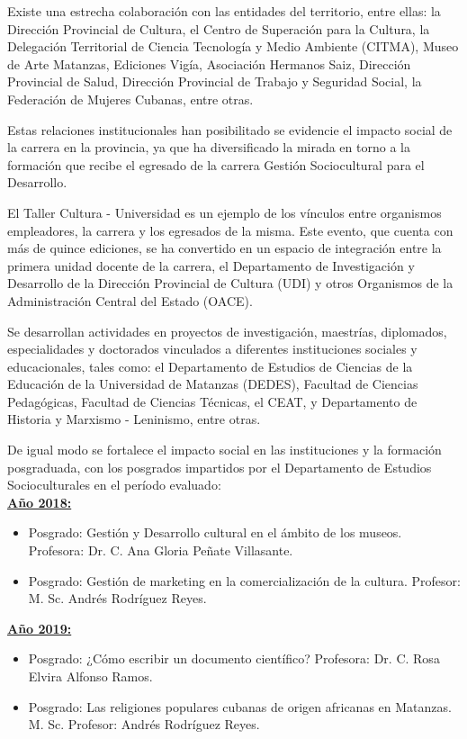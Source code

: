 Existe una estrecha colaboración con las entidades del territorio, entre ellas: la Dirección Provincial de Cultura, el Centro de Superación para la Cultura, la Delegación Territorial de Ciencia Tecnología y Medio Ambiente (CITMA), Museo de Arte Matanzas, Ediciones Vigía, Asociación Hermanos Saiz, Dirección Provincial de Salud, Dirección Provincial de Trabajo y Seguridad Social, la Federación de Mujeres Cubanas, entre otras.

Estas relaciones institucionales han posibilitado se evidencie el impacto social de la carrera en la provincia, ya que ha diversificado la mirada en torno a la formación que recibe el egresado de la carrera Gestión Sociocultural para el Desarrollo.

El Taller Cultura - Universidad es un ejemplo de los vínculos entre organismos empleadores, la carrera y los egresados de la misma. Este evento, que cuenta con más de quince ediciones, se ha convertido en un espacio de integración entre la primera unidad docente de la carrera, el Departamento de Investigación y Desarrollo de la Dirección Provincial de Cultura (UDI) y otros Organismos de la Administración Central del Estado (OACE).

Se desarrollan actividades en proyectos de investigación, maestrías, diplomados, especialidades y doctorados vinculados a diferentes instituciones sociales y educacionales, tales como: el Departamento de Estudios de Ciencias de la Educación de la Universidad de Matanzas (DEDES), Facultad de Ciencias Pedagógicas, Facultad de Ciencias Técnicas, el CEAT, y Departamento de Historia y Marxismo - Leninismo, entre otras.

De igual modo se fortalece el impacto social en las instituciones y la formación posgraduada, con los posgrados impartidos por el Departamento de Estudios Socioculturales en el período evaluado:\\

\underline{\textbf{Año 2018:}}

\begin{itemize}
	\item Posgrado: Gestión y Desarrollo cultural en el ámbito de los museos. Profesora: Dr. C. Ana Gloria Peñate Villasante.
	\item Posgrado: Gestión de marketing en la comercialización de la cultura. Profesor: M. Sc. Andrés Rodríguez Reyes.
\end{itemize}

\underline{\textbf{Año 2019:}}

\begin{itemize}
	\item Posgrado: ¿Cómo escribir un documento científico? Profesora: Dr. C. Rosa Elvira Alfonso Ramos.
	\item Posgrado: Las religiones populares cubanas de origen africanas en Matanzas. M. Sc. Profesor: Andrés Rodríguez Reyes. 
\end{itemize}

